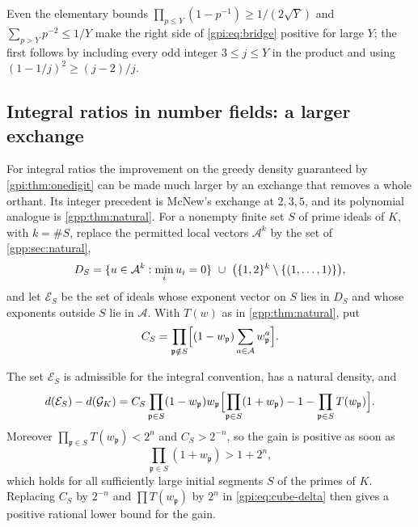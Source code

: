 Even the elementary bounds $\prod_{p\le Y}(1-p^{-1})\ge1/(2\sqrt Y)$ and
$\sum_{p>Y}p^{-2}\le1/Y$ make the right side of \eqref{gpi:eq:bridge} positive for large $Y$;
the first follows by including every odd integer $3\le j\le Y$ in the product and using
$(1-1/j)^2\ge(j-2)/j$.

\subsection{Integral ratios in number fields: a larger exchange}\label{gpi:sec:cube}
{\raggedright{}}

For integral ratios the improvement on the greedy density guaranteed by
\cref{gpi:thm:onedigit} can be made much larger by an exchange that removes a whole orthant.
Its integer precedent is McNew's exchange at $2,3,5$, and its polynomial analogue is
\cref{gpp:thm:natural}. For a nonempty finite set $S$ of prime ideals of $K$, with $k=\#S$,
replace the permitted local vectors $\mathcal A^k$ by the set of \cref{gpp:sec:natural},
\[
 D_S=\set{u\in\mathcal A^k:\min_iu_i=0}\ \cup\ \bigl(\set{1,2}^k\setminus\set{(1,\dots,1)}\bigr),
\]
and let $\mathcal E_S$ be the set of ideals whose exponent vector on $S$ lies in $D_S$ and
whose exponents outside $S$ lie in $\mathcal A$. With $T(w)$ as in \cref{gpp:thm:natural}, put
\[
 C_S=\prod_{\mathfrak p\notin S}\Bigl[(1-w_{\mathfrak p})\sum_{a\in\mathcal A}w_{\mathfrak p}^a\Bigr].
\]

\begin{proposition}\label{gpi:prop:cube}
The set $\mathcal E_S$ is admissible for the integral convention, has a natural density, and
\begin{equation}\label{gpi:eq:cube-delta}
 d(\mathcal E_S)-d(\mathcal G_K)=C_S\prod_{\mathfrak p\in S}(1-w_{\mathfrak p})w_{\mathfrak p}
 \Bigl[\prod_{\mathfrak p\in S}(1+w_{\mathfrak p})-1-\prod_{\mathfrak p\in S}T(w_{\mathfrak p})\Bigr].
\end{equation}
Moreover $\prod_{\mathfrak p\in S}T(w_{\mathfrak p})<2^n$ and $C_S>2^{-n}$, so the gain is
positive as soon as
\begin{equation}\label{gpi:eq:cube-test}
 \prod_{\mathfrak p\in S}(1+w_{\mathfrak p})>1+2^n ,
\end{equation}
which holds for all sufficiently large initial segments $S$ of the primes of $K$. Replacing
$C_S$ by $2^{-n}$ and $\prod T(w_{\mathfrak p})$ by $2^n$ in \eqref{gpi:eq:cube-delta} then
gives a positive rational lower bound for the gain.
\end{proposition}


